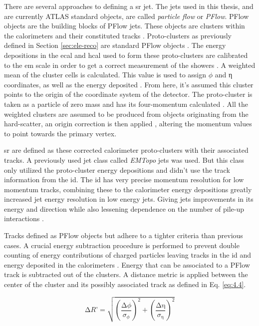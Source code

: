 There are several approaches to defining a \gls{sr} jet. The jets used in this thesis, and are currently ATLAS standard objects, are called \textit{particle flow} or \textit{PFlow}.
PFlow objects are the building blocks of PFlow jets. These objects are clusters within the calorimeters and their constituted tracks \cite{pflow,jes}. Proto-clusters as previously defined in 
Section \ref{sec:ele-reco} are standard PFlow objects \cite{ele-reco}. The energy depositions in the \gls{ecal} and \gls{hcal} used to form these proto-clusters are calibrated 
to the \gls{em} scale in order to get a correct measurement of the showers \cite{jes}. A weighted mean of the cluster cells is calculated. This value is used to assign 
$\phi$ and η coordinates, as well as the energy deposited \cite{topo-cluster}. From here, it's assumed this cluster points to the origin of the coordinate system of the detector.
The proto-cluster is taken as a particle of zero mass and has its four-momentum calculated \cite{topo-cluster}. All the weighted clusters are assumed to be produced from objects
originating from the hard-scatter, an origin correction is then applied \cite{jes}, altering the momentum values to point towards the primary vertex. 
\par
\gls{sr} are defined as these corrected calorimeter proto-clusters with their associated tracks. A previously used jet class called \textit{EMTopo} jets was used. But this class 
only utilized the proto-cluster energy depositions and didn't use the track information from the \gls{id}. The \gls{id} has very precise momentum resolution for low 
momentum tracks, combining these to the calorimeter energy depositions greatly increased jet energy resolution in low energy jets. Giving jets improvements in its energy and 
direction while also lessening dependence on the number of pile-up interactions \cite{jes}.
\par
Tracks defined as PFlow objects but adhere to a tighter criteria than previous cases. A crucial energy subtraction procedure is performed to prevent double counting of energy 
contributions of charged particles leaving tracks in the \gls{id} and energy deposited in the calorimeters \cite{pflow,jes}. Energy that can be associated to a PFlow track is 
subtracted out of the clusters. A distance metric is applied between the center of the cluster and its possibly associated track as defined in Eq. \ref{eq:4.4}.

\begin{equation}\label{eq:4.4}
    ∆\textit{R'} = \sqrt{\left(\frac{∆\phi}{\sigma_{\phi}}\right)^{\textrm{2}}+\left(\frac{∆\textrm{η}}{\sigma_{\textrm{η}}}\right)^{\textrm{2}}}
\tag{4.4}
\end{equation}

